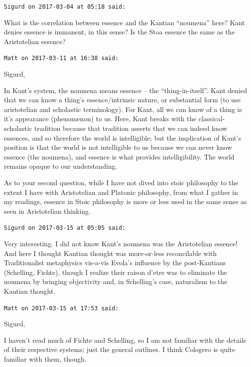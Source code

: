 \begin{footnotesize}
\begin{sffamily}
\texttt{Sigurd on 2017-03-04 at 05:18 said:}

What is the correlation between essence and the Kantian ``noumena'' here? Kant denies essence is immanent, in this sense? Is the Stoa essence the same as the Aristotelian essence?

\hfill

\texttt{Matt on 2017-03-11 at 16:38 said:}

Sigurd,

In Kant's system, the noumena means essence -- the ``thing-in-itself''. Kant denied that we can know a thing's essence/intrinsic nature, or substantial form (to use aristotelian and scholastic terminology). For Kant, all we can know of a thing is it's appearance (phenomenon) to us. Here, Kant breaks with the classical-scholastic tradition because that tradition asserts that we can indeed know essences, and so therefore the world is intelligible; but the implication of Kant's position is that the world is not intelligible to us because we can never know essence (the noumena), and essence is what provides intelligibility. The world remains opaque to our understanding.

As to your second question, while I have not dived into stoic philosophy to the extent I have with Aristotelian and Platonic philosophy, from what I gather in my readings, essence in Stoic philosophy is more or less used in the same sense as seen in Aristotelian thinking.

\hfill

\texttt{Sigurd on 2017-03-15 at 05:05 said:}

Very interesting. I did not know Kant's noumena was the Aristotelian essence! And here I thought Kantian thought was more-or-less reconcilable with Traditionalist metaphysics vis-a-vis Evola's influence by the post-Kantians (Schelling, Fichte), though I realize their raison d'etre was to eliminate the noumena by bringing objectivity and, in Schelling's case, naturalism to the Kantian thought.

\hfill

\texttt{Matt on 2017-03-15 at 17:53 said:}

Sigurd,

I haven't read much of Fichte and Schelling, so I am not familiar with the details of their respective systems; just the general outlines. I think Cologero is quite familiar with them, though.


\end{sffamily}
\end{footnotesize}
